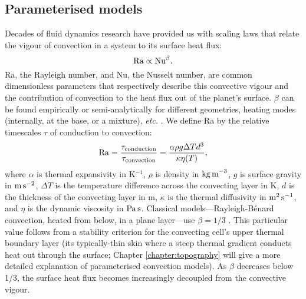 

\subsection{Parameterised models}

Decades of fluid dynamics research have provided us with scaling laws that relate the vigour of convection in a system to its surface heat flux:
\begin{equation}
\label{eq:Ra-Nu}
{\rm Ra} \propto {\rm Nu}^\beta.
\end{equation}
Ra, the Rayleigh number, and Nu, the Nusselt number, are common dimensionless parameters that respectively describe this convective vigour and the contribution of convection to the heat flux out of the planet's surface. $\beta$ can be found empirically or semi-analytically for different geometries, heating modes (internally, at the base, or a mixture), \textit{etc.} \citep[e.g.,][]{turcotte_boundarylayer_1967, fowler_fast_1985, solomatov_scaling_1995, thiriet_scaling_2019, ferrick_generalizing_2023}. We define Ra by the relative timescales $\tau$ of conduction to convection:
\begin{equation}\label{eq:Ra-background}
\mathrm{Ra} = \frac{\tau_{\rm conduction}}{\tau_{\rm convection}}= \frac{\alpha \rho g \Delta T d^3 }{ \kappa \eta(T)},
\end{equation}
where $\alpha$ is thermal expansivity in K$^{-1}$, $\rho$ is density in ${\rm kg\,m}^{-3}$, $g$ is surface gravity in ${\rm m\,s^{-2}}$, $\Delta T$ is the temperature difference across the convecting layer in K, $d$ is the thickness of the convecting layer in m, $\kappa$ is the thermal diffusivity in ${\rm m^{2}\,s^{-1}}$, and $\eta$ is the dynamic viscosity in ${\rm Pa\,s}$. Classical models---Rayleigh-B\' enard convection, heated from below, in a plane layer---use $\beta = 1/3$ \citep{turcotte_geodynamics_2002}. This particular value follows from a stability criterion for the convecting cell's upper thermal boundary layer (its typically-thin skin where a steep thermal gradient conducts heat out through the surface; Chapter \ref{chapter:topography} will give a more detailed explanation of parameterised convection models). %
As $\beta$ decreases below 1/3, the surface heat flux becomes increasingly decoupled from the convective vigour. 

